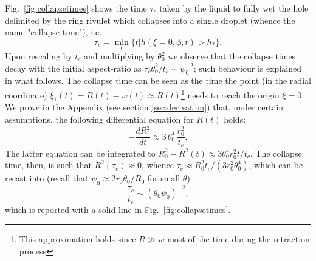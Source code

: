 \documentclass[twoside,twocolumn,9pt]{article}
\begin{document}
Fig.~\ref{fig:collapsetimes} shows the time $\tau_c$ taken by the liquid to fully wet the hole delimited by the ring rivulet which collapses into a single droplet (whence the name "collapse time"), i.e. 
\begin{equation}\label{eq:collapsetime}
\tau_c = \min_t \{t | h(\xi=0,\phi,t) > h_{\ast}\}.
\end{equation}
Upon rescaling by $t_c$ and multiplying by $\theta_0^2$ we observe that the collapse times decay with the initial aspect-ratio as $\tau_c \theta_0^2/t_c \sim \psi_0^{-2}$; such behaviour is explained in what follows.
The collapse time can be seen as the time the point (in the radial coordinate) $\xi_1(t) = R(t) - w(t) \approx R(t)$\footnote{This approximation holds since $R \gg w$ most of the time during the retraction process} needs to reach the origin $\xi = 0$. 
We prove in the Appendix (see section \ref{sec:derivation}) that, under certain assumptions, the following differential equation for $R(t)$ holds:
\begin{equation}\label{eq:modelC4}
-\frac{d R^2}{dt} \approx 3 \, \theta_0^4 \, \frac{r_0^2}{t_c}.
\end{equation}
The latter equation can be integrated to $R_0^2 - R^2(t) \approx 3 \theta_0^4 r_0^2 t/t_c$.
The collapse time, then, is such that $R^2(\tau_c) \approx 0$, whence $\tau_c  \approx R_0^2 t_c/(3 r_0^2 \theta_0^4)$, which can be recast into (recall that $\psi_0 \approx 2 r_0 \theta_0/R_0$ for small $\theta$) 
\begin{equation}\label{eq:modeltauc}
\frac{\tau_c}{t_c} \sim  (\theta_0 \psi_0)^{-2},
\end{equation}
which is reported with a solid line in Fig.~\ref{fig:collapsetimes}.
\end{document}
